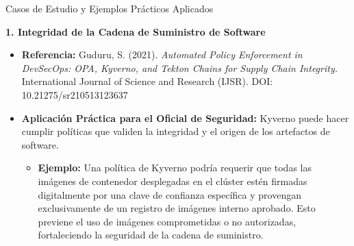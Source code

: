 \documentclass[aspectratio=169]{beamer}
\begin{document}
\begin{frame}{Casos de Estudio y Ejemplos Prácticos Aplicados}


\textbf{1. Integridad de la Cadena de Suministro de Software}
\begin{itemize}
  \item \textbf{Referencia:} Guduru, S. (2021). \textit{Automated Policy Enforcement in DevSecOps: OPA, Kyverno, and Tekton Chains for Supply Chain Integrity.} International Journal of Science and Research (IJSR). DOI: 10.21275/sr210513123637
  \item \textbf{Aplicación Práctica para el Oficial de Seguridad:} Kyverno puede hacer cumplir políticas que validen la integridad y el origen de los artefactos de software.
  \begin{itemize}
    \item \textbf{Ejemplo:} Una política de Kyverno podría requerir que todas las imágenes de contenedor desplegadas en el clúster estén firmadas digitalmente por una clave de confianza específica y provengan exclusivamente de un registro de imágenes interno aprobado. Esto previene el uso de imágenes comprometidas o no autorizadas, fortaleciendo la seguridad de la cadena de suministro.
  \end{itemize}
\end{itemize}
\end{frame}
\end{document}
